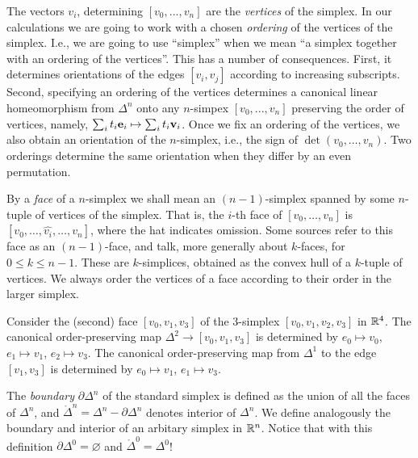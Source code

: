 \documentclass[11pt,a4paper]{report}
\begin{document}
		      	
		      	
		      The vectors $v_i$, determining  $ [v_0,... , v_n] $	
		      are the \emph{vertices} of the simplex.	
		      In our calculations we are going to work with a chosen \emph{ordering} of the vertices of the simplex. I.e., 	
		      we are going to use  ``simplex'' when we  mean ``a simplex together with an ordering of the vertices''.	
		      This has a number of consequences. First, it	
              determines orientations of the edges $[v_i, v_j]$ according to increasing subscripts.	
              Second, specifying an ordering of the vertices  determines	
              a canonical linear homeomorphism from   	
              $\Delta^n$ onto any $n$-simpex $ [v_0,... , v_n] $ preserving 	
              the order of vertices, namely,	
              $\sum_i t_i{\bf e}_i\mapsto \sum_i t_i {\bf v}_i$.	
	      Once we fix an ordering of the vertices, we also obtain  an orientation of the $n$-simplex, i.e., the sign of	
	      $\det(v_0,\ldots,v_n)$. Two orderings determine the same orientation when they differ by an even permutation.	
	      	
	      By a \emph{face} of a $n$-simplex we shall mean an $(n-1)$-simplex spanned by some $n$-tuple of vertices of the simplex. That is,	
	      the $i$-th face of $[v_0,\ldots,v_n]$ is	
	       $[v_0,\ldots,\widehat{v_i},\ldots,v_n]$, where the hat indicates omission. Some sources refer to this face as an	
	       $(n-1)$-face, and talk, more generally about $k$-faces, for $0\leq k\leq n-1$. These are $k$-simplices, obtained as	
	       the convex hull of  a $k$-tuple of vertices. We always order the vertices of a face according to their order	
	       in the larger simplex.	
	       	
	       \begin{Ex}	
	       	Consider the (second) face $[v_0,v_1,v_3]$ of the $3$-simplex $[v_0,v_1,v_2,v_3]$ in $\mathbb{R}^4$. The canonical order-preserving map	
	       	$\Delta^2\to [v_0,v_1,v_3]$ is determined by $e_0\mapsto v_0$, $e_1\mapsto v_1$, $e_2\mapsto v_3$. The canonical order-preserving	
	       	map from $\Delta^1$ to the edge $[v_1,v_3]$ is determined by $e_0\mapsto v_1$, $e_1\mapsto v_3$.	
	       \end{Ex}	
	      	
		      	
		     	
                    	
             The \emph{boundary} $\partial\Delta^n$ of the standard simplex is defined as the union of all the faces of $\Delta^n$, and	
             $\mathring{\Delta}^n = \Delta^n - \partial\Delta^n $ denotes interior of $\Delta^n$. We define analogously the boundary and	
             interior of an arbitary simplex in $\mathbb{R}^n$.	
             Notice that with this definition  $\partial \Delta^0=\varnothing$ and $\mathring{\Delta}^0= \Delta^0$!	
             	
\end{document}
